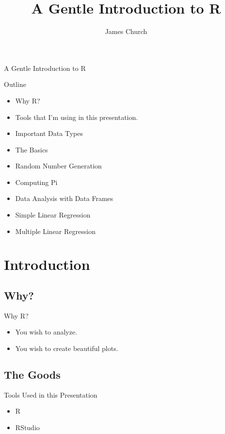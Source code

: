 \documentclass{beamer}
\author{James Church}
\title{A Gentle Introduction to R}
\begin{document}
\frame[plain]{ \titlepage }

\begin{frame}{A Gentle Introduction to R}

    Outline

    \begin{itemize}
        \item Why R?
        \item Tools that I'm using in this presentation.
        \item Important Data Types
        \item The Basics
        \item Random Number Generation
        \item Computing Pi
        \item Data Analysis with Data Frames
        \item Simple Linear Regression
        \item Multiple Linear Regression
    \end{itemize}

\end{frame}

\section{Introduction}

\subsection{Why?}

\begin{frame}{Why R?}
     \begin{itemize}
        \item You wish to analyze.
        \item You wish to create beautiful plots.
    \end{itemize}
\end{frame}

\subsection{The Goods}

\begin{frame}{Tools Used in this Presentation}
    \begin{itemize}
        \item R
        \item RStudio
    \end{itemize}
\end{frame}
\end{document}
